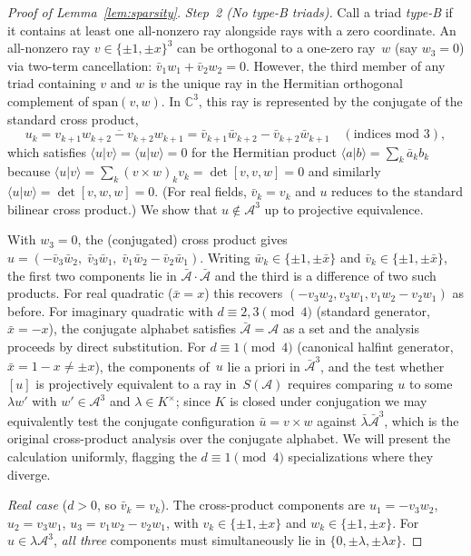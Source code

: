 \documentclass[12pt,a4paper]{article}
\newcommand{\C}{\mathbb{C}}
\newcommand{\braket}[2]{\langle #1 | #2 \rangle}
\begin{document}
\begin{proof}[Proof of Lemma~\ref{lem:sparsity}]
\medskip
\noindent\textit{Step~2 (No type-B triads).}
Call a triad \emph{type-B} if it contains at least one all-nonzero ray
alongside rays with a zero coordinate.  An all-nonzero ray
$v \in \{\pm 1, \pm x\}^3$ can be orthogonal to a one-zero ray~$w$
(say $w_3 = 0$) via two-term cancellation:
$\bar{v}_1 w_1 + \bar{v}_2 w_2 = 0$.  However, the third member of
any triad containing $v$ and $w$ is the unique ray in the Hermitian
orthogonal complement of $\mathrm{span}(v, w)$.  In $\C^3$, this ray
is represented by the conjugate of the standard cross product,
\[
  u_k = \overline{v_{k+1} w_{k+2} - v_{k+2} w_{k+1}}
      = \bar v_{k+1}\bar w_{k+2} - \bar v_{k+2}\bar w_{k+1}
  \quad (\text{indices mod } 3),
\]
which satisfies $\braket{u}{v} = \braket{u}{w} = 0$ for the
Hermitian product $\braket{a}{b} = \sum_k \bar a_k b_k$ because
$\braket{u}{v} = \sum_k (v \times w)_k v_k = \det[v, v, w] = 0$ and
similarly $\braket{u}{w} = \det[v, w, w] = 0$.  (For real fields,
$\bar{v}_k = v_k$ and $u$ reduces to the standard bilinear cross
product.)  We show that $u \notin \mathcal{A}^3$ up to projective
equivalence.

With $w_3 = 0$, the (conjugated) cross product gives
$u = (-\bar{v}_3 \bar w_2,\; \bar{v}_3 \bar w_1,\;
\bar{v}_1 \bar w_2 - \bar{v}_2 \bar w_1)$.  Writing $\bar w_k
\in \{\pm 1, \pm \bar x\}$ and $\bar v_k \in \{\pm 1, \pm\bar x\}$,
the first two components lie in $\bar{\mathcal{A}} \cdot
\bar{\mathcal{A}}$ and the third is a difference of two such
products.  For real quadratic ($\bar x = x$) this recovers
$(-v_3 w_2, v_3 w_1, v_1 w_2 - v_2 w_1)$ as before.  For imaginary
quadratic with $d \equiv 2, 3 \pmod 4$ (standard generator,
$\bar x = -x$), the conjugate alphabet satisfies
$\bar{\mathcal A} = \mathcal A$ as a set and the analysis proceeds
by direct substitution.  For $d \equiv 1 \pmod 4$ (canonical
halfint generator, $\bar x = 1 - x \neq \pm x$), the components
of~$u$ lie a priori in $\bar{\mathcal A}^3$, and the test whether
$[u]$ is projectively equivalent to a ray in~$S(\mathcal{A})$
requires comparing $u$ to some $\lambda w'$ with
$w' \in \mathcal{A}^3$ and $\lambda \in K^\times$; since $K$ is
closed under conjugation we may equivalently test the conjugate
configuration $\bar u = v \times w$ against
$\bar\lambda \bar{\mathcal A}^3$, which is the original cross-product
analysis over the conjugate alphabet.  We will present the
calculation uniformly, flagging the $d \equiv 1 \pmod 4$ specializations
where they diverge.

\emph{Real case} ($d > 0$, so $\bar{v}_k = v_k$).
The cross-product components are $u_1 = -v_3 w_2$,
$u_2 = v_3 w_1$, $u_3 = v_1 w_2 - v_2 w_1$, with
$v_k \in \{\pm 1, \pm x\}$ and $w_k \in \{\pm 1, \pm x\}$.
For $u \in \lambda\mathcal{A}^3$, \emph{all three} components must
simultaneously lie in $\{0, \pm\lambda, \pm\lambda x\}$.


\end{proof}
\end{document}
